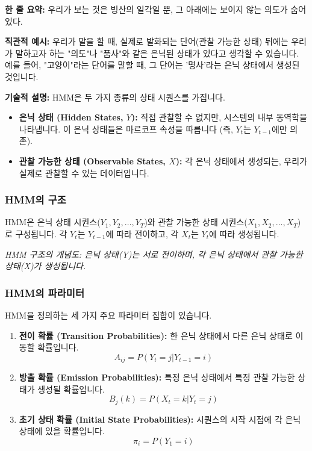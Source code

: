 \documentclass[11pt,a4paper]{article}
\theoremstyle{definition}
\begin{document}
\begin{tcolorbox}[conceptbox, title=은닉 마르코프 모델 (HMM)의 핵심 아이디어]
\textbf{한 줄 요약:} 우리가 보는 것은 빙산의 일각일 뿐, 그 아래에는 보이지 않는 의도가 숨어있다.

\textbf{직관적 예시:} 우리가 말을 할 때, 실제로 발화되는 단어(관찰 가능한 상태) 뒤에는 우리가 말하고자 하는 "의도"나 "품사"와 같은 은닉된 상태가 있다고 생각할 수 있습니다. 예를 들어, "고양이"라는 단어를 말할 때, 그 단어는 '명사'라는 은닉 상태에서 생성된 것입니다.

\textbf{기술적 설명:} HMM은 두 가지 종류의 상태 시퀀스를 가집니다.
\begin{itemize}
    \item \textbf{은닉 상태 (Hidden States, $Y$):} 직접 관찰할 수 없지만, 시스템의 내부 동역학을 나타냅니다. 이 은닉 상태들은 마르코프 속성을 따릅니다 (즉, $Y_t$는 $Y_{t-1}$에만 의존).
    \item \textbf{관찰 가능한 상태 (Observable States, $X$):} 각 은닉 상태에서 생성되는, 우리가 실제로 관찰할 수 있는 데이터입니다.
\end{itemize}
\end{tcolorbox}

\subsubsection{HMM의 구조}
HMM은 은닉 상태 시퀀스($Y_1, Y_2, \dots, Y_T$)와 관찰 가능한 상태 시퀀스($X_1, X_2, \dots, X_T$)로 구성됩니다. 각 $Y_t$는 $Y_{t-1}$에 따라 전이하고, 각 $X_t$는 $Y_t$에 따라 생성됩니다.

\begin{center}
\end{center}
\textit{HMM 구조의 개념도: 은닉 상태(Y)는 서로 전이하며, 각 은닉 상태에서 관찰 가능한 상태(X)가 생성됩니다.}

\subsubsection{HMM의 파라미터}
HMM을 정의하는 세 가지 주요 파라미터 집합이 있습니다.
\begin{enumerate}
    \item \textbf{전이 확률 (Transition Probabilities):} 한 은닉 상태에서 다른 은닉 상태로 이동할 확률입니다.
    \[ A_{ij} = P(Y_t = j | Y_{t-1} = i) \]
    \item \textbf{방출 확률 (Emission Probabilities):} 특정 은닉 상태에서 특정 관찰 가능한 상태가 생성될 확률입니다.
    \[ B_j(k) = P(X_t = k | Y_t = j) \]
    \item \textbf{초기 상태 확률 (Initial State Probabilities):} 시퀀스의 시작 시점에 각 은닉 상태에 있을 확률입니다.
    \[ \pi_i = P(Y_1 = i) \]
\end{enumerate}
\end{document}
